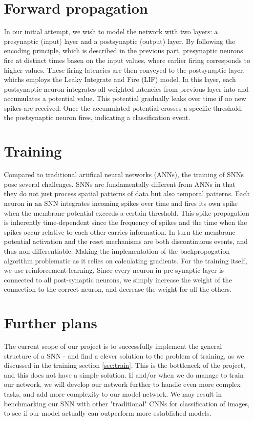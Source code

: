 \documentclass{article}
\begin{document}
\section*{Forward propagation}
In our initial attempt, we wish to model the network with two layers: a presynaptic (input) layer and a postsynaptic (output) layer. By following the encoding principle, which is described in the previous part, presynaptic neurons fire at distinct times basen on the input values, where earlier firing corresponds to higher values. These firing latencies are then conveyed to the postsynaptic layer, whichs employs the Leaky Integrate and Fire (LIF) model. In this layer, each postsynaptic neuron integrates all weighted latencies from previous layer into and accumulates a potential value. This potential gradually leaks over time if no new spikes are received. Once the accumulated potential crosses a specific threshold, the postsynaptic neuron fires, indicating a classification event.

\section*{Training}\label{sec:train}

Compared to traditional artifical neural networks (ANNs), the training of SNNs pose several challenges. SNNs are fundamentally different from ANNs in that they do not just process spatial patterns of data but also temporal patterns. Each neuron in an SNN integrates incoming spikes over time and fires its own spike when the membrane potential exceeds a certain threshold. This spike propagation is inherently time-dependent since the frequency of spikes and the time when the spikes occur relative to each other carries information. In turn the membrane potential activation and the reset mechanisms are both discontinuous events, and thus non-differentiable. Making the implementation of the backpropogation algorithm problematic as it relies on calculating gradients. For the training itself, we use reinforcement learning. Since every neuron in pre-synaptic layer is connected to all post-synaptic neurons, we simply increase the weight of the connection to the correct neuron, and decrease the weight for all the others. 





\section*{Further plans}
The current scope of our project is to successfully implement the general structure of a SNN - and find a clever solution to the problem of training, as we discussed in the training section \ref{sec:train}. This is the bottleneck of the project, and this does not have a simple solution. If and/or when we do manage to train our network, we will develop our network further to handle even more complex tasks, and add more complexity to our model network. We may result in benchmarking our SNN with other "traditional" CNNs for classification of images, to see if our model actually can outperform more established models.
\end{document}
